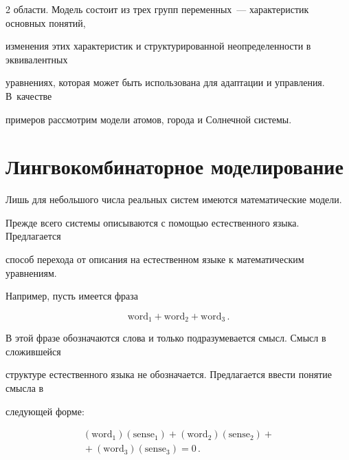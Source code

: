 \begin{multicols}{2}
области. Модель состоит из трех групп переменных~--- характеристик основных понятий, 


изменения этих характеристик и структурированной неопределенности в эквивалентных 


уравнениях, которая может быть использована для адаптации и управ\-ле\-ния. В~качестве 


примеров рассмотрим модели атомов, города и Солнечной сис\-те\-мы.





\section{Лингвокомбинаторное моделирование}





      Лишь для небольшого числа реальных систем имеются математические модели. 


Прежде всего сис\-те\-мы описываются с помощью естественного языка. Предлагается 


способ перехода от описания на естественном языке к математическим уравнениям. 


Например, пусть имеется фраза


\begin{equation}


            \mbox{word}_1 + \mbox{word}_2 + \mbox{word}_3\,.


            \label{e1-ign}


            \end{equation}





В этой фразе обозначаются слова и только подразумевается смысл. Смысл в сложившейся 


структуре естественного языка не обозначается. Предлагается ввести понятие смысла в 


следующей форме:


\begin{multline}


         (\mbox{word}_1)(\mbox{sense}_1) + (\mbox{word}_2)(\mbox{sense}_2) +{}\\


         {}+ (\mbox{word}_3)(\mbox{sense}_3) = 0\,.


         \label{e2-ign}


         \end{multline}






\end{multicols}
